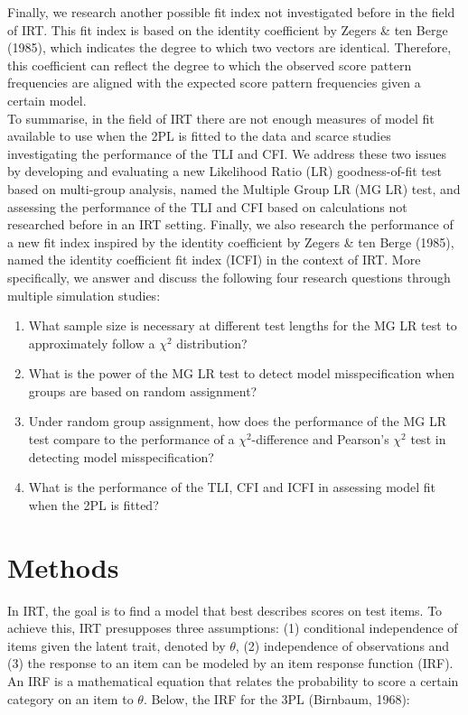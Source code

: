 \documentclass[Royal,sageapa,times,doublespace]{sagej}
\begin{document}
\indent Finally, we research another possible fit index not investigated before in the field of IRT. This fit index is based on the identity coefficient by Zegers \& ten Berge (1985), which indicates the degree to which two vectors are identical. Therefore, this coefficient can reflect the degree to which the observed score pattern frequencies are aligned with the expected score pattern frequencies given a certain model. \\
\indent To summarise, in the field of IRT there are not enough measures of model fit available to use when the 2PL is fitted to the data and scarce studies investigating the performance of the TLI and CFI. We address these two issues by developing and evaluating a new Likelihood Ratio (LR) goodness-of-fit test based on multi-group analysis, named the Multiple Group LR (MG LR) test, and assessing the performance of the TLI and CFI based on calculations not researched before in an IRT setting. Finally, we also research the performance of a new fit index inspired by the identity coefficient by Zegers \& ten Berge (1985), named the identity coefficient fit index (ICFI) in the context of IRT. More specifically, we answer and discuss the following four research questions through multiple simulation studies:
\begin{enumerate}
\item{What sample size is necessary at different test lengths for the MG LR test to approximately follow a $\chi^2$ distribution?}
\item{What is the power of the MG LR test to detect model misspecification when groups are based on random assignment?}
\item{Under random group assignment, how does the performance of the MG LR test compare to the performance of a $\chi^2$-difference and Pearson's $\chi^2$ test in detecting model misspecification?}
\item{What is the performance of the TLI, CFI and ICFI in assessing model fit when the 2PL is fitted?}
\end{enumerate}

\section{Methods}
In IRT, the goal is to find a model that best describes scores on test items. To achieve this, IRT presupposes three assumptions: (1) conditional independence of items given the latent trait, denoted by $\theta$, (2) independence of observations and (3) the response to an item can be modeled by an item response function (IRF). An IRF is a mathematical equation that relates the probability to score a certain category on an item to $\theta$. Below, the IRF for the 3PL (Birnbaum, 1968):
\end{document}
